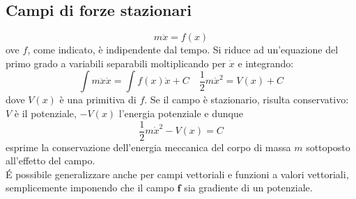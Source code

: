 \documentclass[10pt, oneside]{book}
\theoremstyle{plain}
\begin{document}
\subsection{Campi di forze stazionari}
\[m \ddot x = f(x)\]
ove $f$, come indicato, è indipendente dal tempo. Si riduce ad un'equazione del primo grado a variabili separabili moltiplicando per $\dot x$ e integrando: 
\[\int m \ddot x \dot x = \int f(x) \dot x + C \quad \frac{1}{2} m \dot x^2 = V(x) + C\]
dove $V(x)$ è una primitiva di $f$. Se il campo è stazionario, risulta conservativo: $V$ è il potenziale, $-V(x)$ l'energia potenziale e dunque
\[\frac{1}{2} m \dot x^2 - V(x) = C\]
esprime la conservazione dell'energia meccanica del corpo di massa $m$ sottoposto all'effetto del campo.
\\\'E possibile generalizzare anche per campi vettoriali e funzioni a valori vettoriali, semplicemente imponendo che il campo $\mathbf{f}$ sia gradiente di un potenziale.
\end{document}
